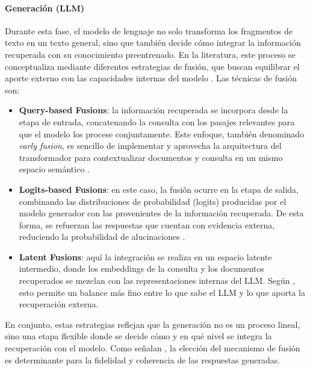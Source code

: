 \paragraph{Generación (LLM)}  Durante esta fase, el modelo de lenguaje no solo transforma los fragmentos de texto en un texto general, sino que también decide cómo integrar la información 
recuperada con su conocimiento preentrenado. En la literatura, este proceso se conceptualiza mediante diferentes estrategias de fusión, que buscan equilibrar el aporte
externo con las capacidades internas del modelo \parencite{zhao2024rag,hambarde2023ir}. Las técnicas de fusión son:  

\begin{itemize}
    \item \textbf{Query-based Fusions}: la información recuperada se incorpora desde la etapa de entrada, concatenando la consulta con los pasajes relevantes para que el modelo los procese conjuntamente. Este enfoque, también denominado \textit{early fusion}, es sencillo de implementar y aprovecha la arquitectura del transformador para contextualizar documentos y consulta en un mismo espacio semántico \parencite{gao2023rag}.  

    \item \textbf{Logits-based Fusions}: en este caso, la fusión ocurre en la etapa de salida, combinando las distribuciones de probabilidad (logits) producidas por el modelo generador con las provenientes de la información recuperada. De esta forma, se refuerzan las respuestas que cuentan con evidencia externa, reduciendo la probabilidad de alucinaciones \parencite{zhai2024llmIR}.  

    \item \textbf{Latent Fusions}: aquí la integración se realiza en un espacio latente intermedio, donde los embeddings de la consulta y los documentos recuperados se mezclan con las representaciones internas del LLM. Según \textcite{hu2024ragrau}, esto permite un balance más fino entre lo que sabe el LLM y lo que aporta la recuperación externa.  
\end{itemize}

En conjunto, estas estrategias reflejan que la generación no es un proceso lineal, sino una etapa flexible donde se decide cómo y en qué nivel se integra la 
recuperación con el modelo. Como señalan \textcite{zhao2024rag}, la elección del mecanismo de fusión es determinante para la fidelidad y coherencia de las respuestas 
generadas.

